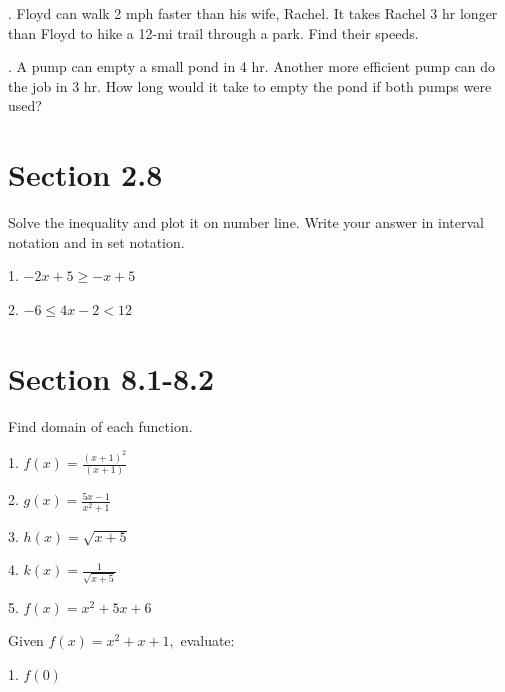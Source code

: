 \documentclass[12pt]{article}
\begin{document}
. Floyd can walk 2 mph faster than his wife, Rachel. It takes Rachel 3 hr longer than Floyd to hike a 12-mi trail through a park. Find their speeds.

\vspace{20em}

. A pump can empty a small pond in 4 hr. Another more eﬃcient pump can do the job in 3 hr. How long would it take to empty the pond if both pumps were used?
\newpage
\section{Section 2.8}
\vspace{1.5em} 

Solve the inequality and plot it on number line. Write your answer in interval notation and in set notation. 

\vspace{1.5em}

1. $-2x+5\geq -x+5$

\vspace{5em} 

2. $-6\leq 4x-2<12$

\vspace{5em}

\section{Section 8.1-8.2}
Find domain of each function. 
\vspace{1.5em}

1. $f(x)=\frac{(x+1)^{2}}{(x+1)} $ 

\vspace{3.5em}

2. $g(x)=\frac{5x-1}{x^{2}+1} $ 

\vspace{3.5em}

3. $h(x)=\sqrt{x+5}$ 

\vspace{3.5em}

4. $k(x)=\frac{1}{\sqrt{x+5}} $ 

\vspace{3.5em}

5. $f(x)=x^2+5x+6$ 

\newpage 
Given $f(x)=x^2+x+1,$ evaluate: 

\vspace{1.5em}
1. $f(0)$ 

\vspace{4.5em} 
\end{document}
